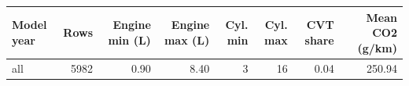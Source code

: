 \begin{tabular}{lrrrrrrr}
\toprule
Model year & Rows & Engine min (L) & Engine max (L) & Cyl. min & Cyl. max & CVT share & Mean CO2 (g/km) \\
\midrule
all & 5982 & 0.90 & 8.40 & 3 & 16 & 0.04 & 250.94 \\
\bottomrule
\end{tabular}
